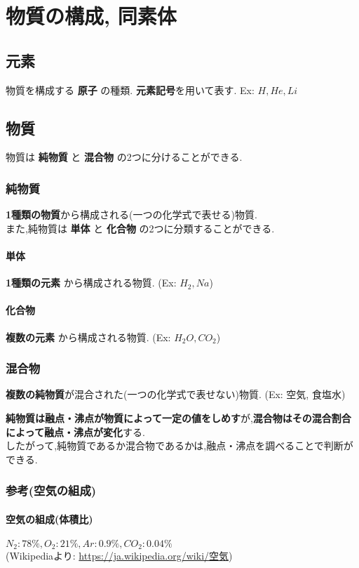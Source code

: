 \chapter{物質の構成, 同素体}

\section{元素}{
	物質を構成する {\bf 原子} の種類. {\bf 元素記号}を用いて表す.
	Ex: $H, He, Li$
}

\section{物質}{
	物質は {\bf 純物質} と {\bf 混合物} の2つに分けることができる. \\
	\subsection{純物質}{
		{\bf 1種類の物質}から構成される(一つの化学式で表せる)物質. \\
		また,純物質は {\bf 単体} と {\bf 化合物} の2つに分類することができる. \\
		\subsubsection{単体}{
			{\bf 1種類の元素} から構成される物質. (Ex: $H_2, Na$)
		}
		\subsubsection{化合物}{
			{\bf 複数の元素} から構成される物質. (Ex: $H_2O, CO_2$)
		}
	}
	\subsection{混合物}{
		{\bf 複数の純物質}が混合された(一つの化学式で表せない)物質. (Ex: 空気, 食塩水)
	}
	
	{\bf 純物質は融点・沸点が物質によって一定の値をしめす}が,{\bf 混合物はその混合割合によって融点・沸点が変化}する. \\
	したがって,純物質であるか混合物であるかは,融点・沸点を調べることで判断ができる.
	
	\subsection{参考(空気の組成)}{
		\subsubsection{空気の組成(体積比)}{
			$N_2 : 78\%, O_2 : 21\%, Ar : 0.9\%, CO_2 : 0.04\% $ \\
			(Wikipediaより: \url{https://ja.wikipedia.org/wiki/空気})
		}
	}
}

